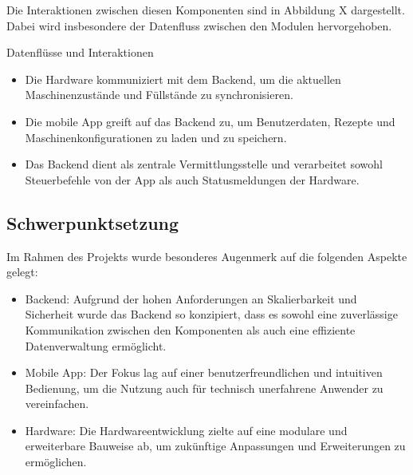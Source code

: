 Die Interaktionen zwischen diesen Komponenten sind in Abbildung X dargestellt. Dabei wird insbesondere der Datenfluss zwischen den Modulen hervorgehoben.

Datenflüsse und Interaktionen

\begin{itemize}
  \item Die Hardware kommuniziert mit dem Backend, um die aktuellen Maschinenzustände und Füllstände zu synchronisieren.
  \item Die mobile App greift auf das Backend zu, um Benutzerdaten, Rezepte und Maschinenkonfigurationen zu laden und zu speichern.
  \item Das Backend dient als zentrale Vermittlungsstelle und verarbeitet sowohl Steuerbefehle von der App als auch Statusmeldungen der Hardware.
\end{itemize}

\subsection{Schwerpunktsetzung}

Im Rahmen des Projekts wurde besonderes Augenmerk auf die folgenden Aspekte gelegt:

\begin{itemize}
  \item Backend: Aufgrund der hohen Anforderungen an Skalierbarkeit und Sicherheit wurde das Backend so konzipiert, dass es sowohl eine zuverlässige Kommunikation zwischen den Komponenten als auch eine effiziente Datenverwaltung ermöglicht.
  \item Mobile App: Der Fokus lag auf einer benutzerfreundlichen und intuitiven Bedienung, um die Nutzung auch für technisch unerfahrene Anwender zu vereinfachen.
  \item Hardware: Die Hardwareentwicklung zielte auf eine modulare und erweiterbare Bauweise ab, um zukünftige Anpassungen und Erweiterungen zu ermöglichen.
\end{itemize}
